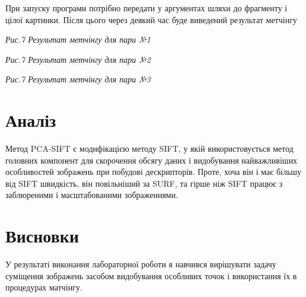 \documentclass{/home/alx/Documents/LaTex/nulp}
\begin{document}
При запуску програми потрібно передати у аргументах шляхи до фрагменту і цілої картинки. Після цього через деякий час буде виведений результат метчінгу

\begin{center}

\textit{Рис.7 Результат метчінгу для пари №1}
\end{center}

\begin{center}

\textit{Рис.7 Результат метчінгу для пари №2}
\end{center}

\begin{center}

\textit{Рис.7 Результат метчінгу для пари №3}
\end{center}

\newpage

\section*{Аналіз}

Метод PCA-SIFT є модифікацією методу SIFT, у якій використовується метод головних компонент для скорочення обсягу даних і видобування найважливіших особливостей зображень при побудові дескрипторів. Проте, хоча він і має більшу від SIFT швидкість, він повільніший за SURF, та гірше ніж SIFT працює з заблюреними і масштабованими зображеннями.

\section*{Висновки}
У результаті виконання лабораторної роботи я навчився вирішувати задачу суміщення зображень засобом видобування особливих точок і використання їх в процедурах матчінгу.
\end{document}
